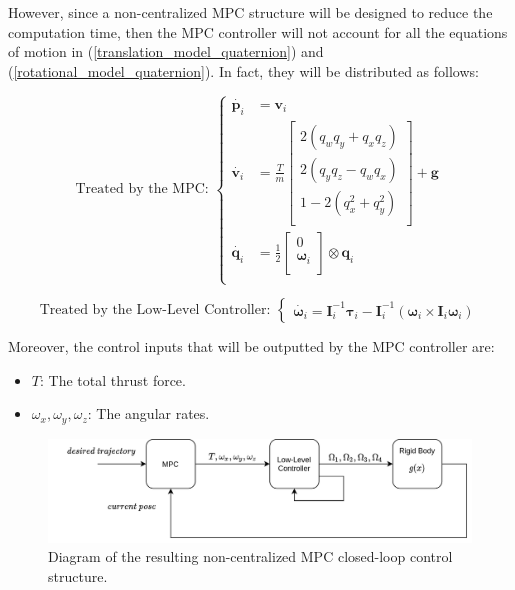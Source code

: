 \documentclass{thesisreport}
\begin{document}
However, since a non-centralized MPC structure will be designed to reduce the computation time, then the MPC controller will not account for all the equations of motion in (\ref{translation_model_quaternion}) and (\ref{rotational_model_quaternion}). In fact, they will be distributed as follows: 

				\begin{equation*}
					\text{Treated by the MPC: }\left\{
					\begin{array}{lll}				
					\dot{\bm{p}_i} &= \bm{v}_i \\
					\dot{\bm{v}_i} &= 
					\frac{T}{m} 
					\begin{bmatrix}
						2 (q_w q_y + q_x q_z) \\
						2 (q_y q_z - q_w q_x) \\
						1 - 2(q_x^2 + q_y^2 ) \\
					\end{bmatrix} + \bm{g} \\			
					\dot{\bm{q}_i} & = \frac{1}{2}
					\begin{bmatrix}
						0 \\
						\bm{\omega}_i \\
					\end{bmatrix} \otimes \bm{q}_i \\
					\end{array}
					\right.
				\end{equation*}
				
				\begin{equation*}
					\text{Treated by the Low-Level Controller: }\left\{
					\begin{array}{l}	
					\dot{\bm{\omega}_i} = \bm{I}_i^{-1} \bm{\tau}_i - \bm{I}_i^{-1} (\bm{\omega}_i \times \bm{I}_i \bm{\omega}_i)
					\end{array}
					\right.
				\end{equation*}

Moreover, the control inputs that will be outputted by the MPC controller are: 

\begin{itemize}
	\item $T$: The total thrust force.
	\item $\omega_x, \omega_y, \omega_z$: The angular rates. 
\end{itemize} 

\newpage

\begin{figure}[h]
	\centering
	\includegraphics[width=\textwidth]{Images/diagrams/new_sim_diagram.png}
	\caption{Diagram of the resulting non-centralized MPC closed-loop control structure.}
	\label{fig:non_centralized_mpc_for_SIL}
\end{figure}
\end{document}
